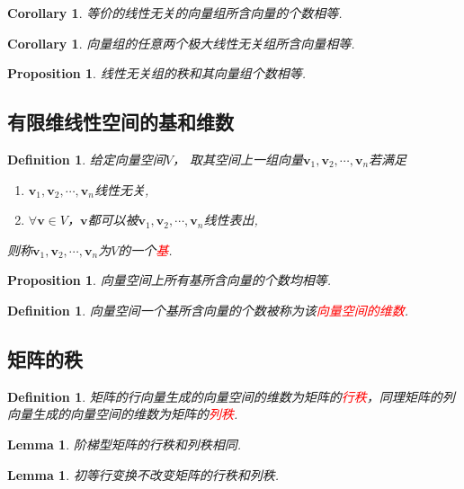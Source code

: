 \documentclass{article}
\newtheorem{lemma}[theorem]{Lemma}
\newtheorem{corollary}[theorem]{Corollary}
\newtheorem{proposition}[theorem]{Proposition}
\newtheorem{definition}[theorem]{Definition}
\newcommand{\mbf}[1]{\bm{#1}}
\newcommand{\redt}[1]{\textcolor{red}{#1}}
\begin{document}
\begin{corollary}
\rm 等价的线性无关的向量组所含向量的个数相等. 
\end{corollary}


\begin{corollary}
\rm 向量组的任意两个极大线性无关组所含向量相等.
\end{corollary}

\begin{proposition}
\rm 线性无关组的秩和其向量组个数相等.
\end{proposition}


\subsection{有限维线性空间的基和维数}

\begin{definition}
\rm 给定向量空间$V$， 取其空间上一组向量$\mbf{v}_1,\mbf{v}_2,\cdots,\mbf{v}_n$若满足
\begin{enumerate}
	\item $\mbf{v}_1,\mbf{v}_2,\cdots,\mbf{v}_n$线性无关,
	\item $\forall \mbf{v} \in V$，$\mbf{v}$都可以被$\mbf{v}_1,\mbf{v}_2,\cdots,\mbf{v}_n$线性表出,
\end{enumerate}
则称$\mbf{v}_1,\mbf{v}_2,\cdots,\mbf{v}_n$为$V$的一个\redt{基}.
\end{definition}

\begin{proposition}
\rm 向量空间上所有基所含向量的个数均相等.
\end{proposition}

\begin{definition}
\rm 向量空间一个基所含向量的个数被称为该\redt{向量空间的维数}.
\end{definition}

\subsection{矩阵的秩}

\begin{definition}
\rm 矩阵的行向量生成的向量空间的维数为矩阵的\redt{行秩}，同理矩阵的列向量生成的向量空间的维数为矩阵的\redt{列秩}.
\end{definition}

\begin{lemma}
\rm 阶梯型矩阵的行秩和列秩相同.
\end{lemma}

\begin{lemma}
\rm 初等行变换不改变矩阵的行秩和列秩.
\end{lemma}
\end{document}
